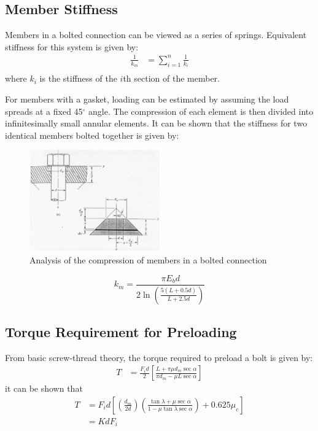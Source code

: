 \subsection{Member Stiffness}
Members in a bolted connection can be viewed as a series of springs. Equivalent stiffness for this system is given by:
\begin{align}
    \frac{1}{k_m} &= \sum_{i=1}^{n} \frac{1}{k_i} \label{eq:member_stiffness_series} \\
\end{align}
where $k_i$ is the stiffness of the $i$th section of the member. 

For members with a gasket, loading can be estimated by assuming the load spreads at a fixed 45$^\circ$ angle. The compression of each element is then divided into infinitesimally small annular elements. It can be shown that the stiffness for two identical members bolted together is given by:
\begin{figure}[h]
    \centering
    \includegraphics[width=0.5\textwidth]{Sections/Figures/bolted connection gasket analysis.png}
    \caption{Analysis of the compression of members in a bolted connection}
    \label{fig:bolted_connection_gasket_analysis}
\end{figure}
\begin{equation}
    k_m = \frac{\pi E_b d}{2\ln\left(\frac{5(L+0.5d)}{L+2.5d}\right)} \label{eq:member_stiffness}
\end{equation}

\subsection{Torque Requirement for Preloading}
From basic screw-thread theory, the torque required to preload a bolt is given by:
\begin{align*}
    T &= \frac{F_i d}{2}\left[\frac{L + \pi \mu d_m \sec\alpha}{\pi d_m - \mu L \sec\alpha}\right] 
\end{align*}
it can be shown that 
\begin{align}
    T &= F_i d \left[ \left(\frac{d_m}{2d}\right)\left(\frac{\tan\lambda + \mu \sec\alpha}{1 - \mu \tan\lambda \sec\alpha}\right) + 0.625\mu_c \right]  \nonumber \\
    &= KdF_i \label{eq:torque_constant}
\end{align}

